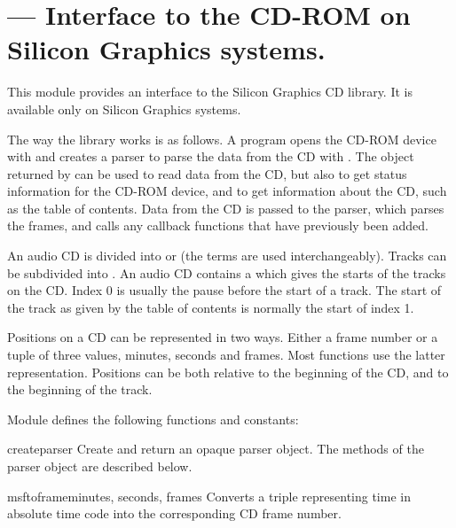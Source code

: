 \section{ ---
         Interface to the CD-ROM on Silicon Graphics systems.}



This module provides an interface to the Silicon Graphics CD library.
It is available only on Silicon Graphics systems.

The way the library works is as follows.  A program opens the CD-ROM
device with  and creates a parser to parse the data
from the CD with .  The object returned by
 can be used to read data from the CD, but also to get
status information for the CD-ROM device, and to get information about
the CD, such as the table of contents.  Data from the CD is passed to
the parser, which parses the frames, and calls any callback
functions that have previously been added.

An audio CD is divided into  or  (the terms
are used interchangeably).  Tracks can be subdivided into
.  An audio CD contains a  which
gives the starts of the tracks on the CD.  Index 0 is usually the
pause before the start of a track.  The start of the track as given by
the table of contents is normally the start of index 1.

Positions on a CD can be represented in two ways.  Either a frame
number or a tuple of three values, minutes, seconds and frames.  Most
functions use the latter representation.  Positions can be both
relative to the beginning of the CD, and to the beginning of the
track.

Module  defines the following functions and constants:


\begin{funcdesc}{createparser}{}
Create and return an opaque parser object.  The methods of the parser
object are described below.
\end{funcdesc}

\begin{funcdesc}{msftoframe}{minutes, seconds, frames}
Converts a  triple
representing time in absolute time code into the corresponding CD
frame number.
\end{funcdesc}

